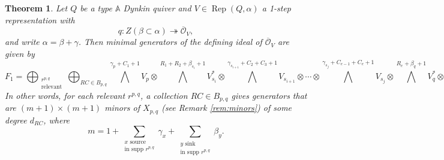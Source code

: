 \documentclass[twoside]{article}
\newcommand{\ds}{\displaystyle\sum}
\newcommand{\orb}{\mathcal{O}}
\newcommand{\ove}{\overline}
\newcommand{\Rep}{\operatorname{Rep}}
\newcommand{\A}{\mathbb{A}}
\newtheorem{theorem}{Theorem}[section]
\theoremstyle{definition}
\begin{document}
\begin{theorem}\label{thm:min}
Let $Q$ be a type $\A$ Dynkin quiver and $V \in \Rep(Q,\alpha)$ a 1-step representation with
$$q:Z(\beta \subset \alpha)\twoheadrightarrow  \overline{\orb}_V,$$
and write $\alpha=\beta+\gamma$. Then minimal generators of the defining ideal of $\ove{\orb}_V$ are given by
\[F_1=\!\!\!\!\bigoplus_{\substack{r^{p,q} \\ \text{relevant}}} \bigoplus_{RC\in B_{p,q}}\!\!\!\! \bigwedge^{\gamma_p+C_1+1}\!\!\! V_{p}\otimes \!\!\!\!\! \bigwedge^{{R_1+R_2+\beta_{s_i}+1}}\!\!\!\! V_{s_i}^*\otimes \!\!\!\!\! \bigwedge^{\gamma_{s_{i+1}}+C_2+C_3+1}\!\!\!\!\!\!\!\!\!\!\!\!\!V_{s_{i+1}}\otimes\cdots\otimes\!\!\!\!\!\!\!\!\!\!\! \bigwedge^{\gamma_{s_j}+C_{e-1}+C_e+1}\!\!\!\!\! V_{s_j} \otimes\!\!\!\! \bigwedge^{R_e+\beta_q+1}\!\!\!V_{q}^*\otimes A(-d_{RC}). \]
In other words,  for each relevant $r^{p,q}$, a collection $RC\in B_{p,q}$ gives generators that are $(m+1) \times (m+1)$ minors of $X_{p,q}$ (see Remark \ref{rem:minors}) of some degree $d_{RC}$, where 
\[m=1+\ds_{\substack{x \text{ source}\\ \text{in supp } r^{p,q}}} \gamma_x +\ds_{\substack{y \text{ sink}\\ \text{in supp } r^{p,q}}} \beta_y.\]
\end{theorem}
\end{document}
